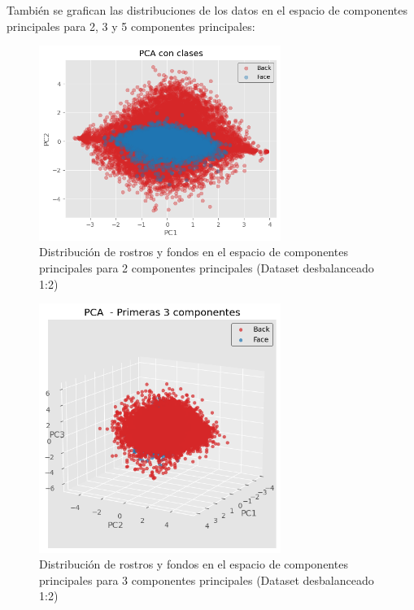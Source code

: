\documentclass{article}
\begin{document}
También se grafican las distribuciones de los datos en el espacio de componentes principales para 2, 3 y 5 componentes principales:

\begin{figure}[H]
    \centering
    \includegraphics[width=0.7\textwidth]{tarea_2/imagenes/pca_classes_x2_v1_20_2_components.png}
    \caption{Distribución de rostros y fondos en el espacio de componentes principales para 2 componentes principales (Dataset desbalanceado 1:2)}
    \label{fig:pca_classes}
\end{figure}

\begin{figure}[H]
    \centering
    \includegraphics[width=0.7\textwidth]{tarea_2/imagenes/pca_classes_x2_v1_20_3_components.png}
    \caption{Distribución de rostros y fondos en el espacio de componentes principales para 3 componentes principales (Dataset desbalanceado 1:2)}
    \label{fig:pca_classes}
\end{figure}
\end{document}
